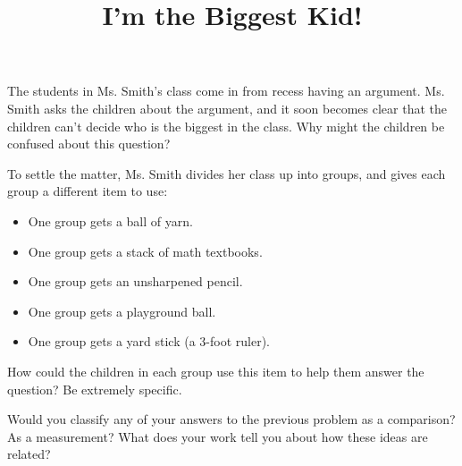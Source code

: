 \documentclass[nooutcomes,noauthor, handout]{ximera}
\title{I'm the Biggest Kid!}
\begin{document}
\begin{abstract}\end{abstract}
\maketitle



\begin{problem}
    The students in Ms. Smith's class come in from recess having an argument.  Ms. Smith asks the children about the argument, and it soon becomes clear that the children can't decide who is the biggest in the class.  Why might the children be confused about this question?
    
   
\end{problem}


\begin{problem}
    To settle the matter, Ms. Smith divides her class up into groups, and gives each group a different item to use:
    \begin{itemize}
        \item One group gets a ball of yarn.
        \item One group gets a stack of math textbooks.
        \item One group gets an unsharpened pencil.
        \item One group gets a playground ball.
        \item One group gets a yard stick (a 3-foot ruler).
    \end{itemize}
    
    How could the children in each group use this item to help them answer the question?  Be extremely specific.
    

\end{problem}

\begin{problem}
Would you classify any of your answers to the previous problem as a comparison? As a measurement? What does your work tell you about how these ideas are related?
\end{problem}
\end{document}
